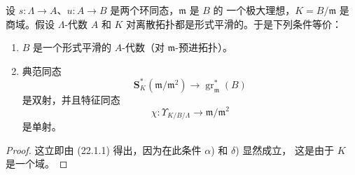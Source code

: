 \begin{corollary}[22.1.2]
\label{0.22.1.2-fr}
设 $s:\Lambda\to A$、$u:A\to B$ 是两个环同态，$\mathfrak m$ 是 $B$ 的
一个极大理想，$K=B/\mathfrak m$ 是商域。假设 $\Lambda$-代数 $A$ 和 $K$
对离散拓扑都是形式平滑的。于是下列条件等价：
\begin{enumerate}
  \item[a)] $B$ 是一个形式平滑的 $A$-代数（对 $\mathfrak m$-预进拓扑）。
  \item[b)] 典范同态
  \begin{equation}
  \tag{22.1.2.1}
  \label{0.22.1.2.1-fr}
    \mathbf S_K^*(\mathfrak m/\mathfrak m^2)
    \longrightarrow\operatorname{gr}_{\mathfrak m}^*(B)
  \end{equation}
  是双射，并且特征同态
  \begin{equation}
  \tag{22.1.2.2}
  \label{0.22.1.2.2-fr}
    \chi:\Upsilon_{K/B/\Lambda}\longrightarrow\mathfrak m/\mathfrak m^2
  \end{equation}
  是单射。
\end{enumerate}
\end{corollary}

\begin{proof}
这立即由 (22.1.1) 得出，因为在此条件 $\alpha$) 和 $\delta$) 显然成立，
这是由于 $K$ 是一个域。
\end{proof}


